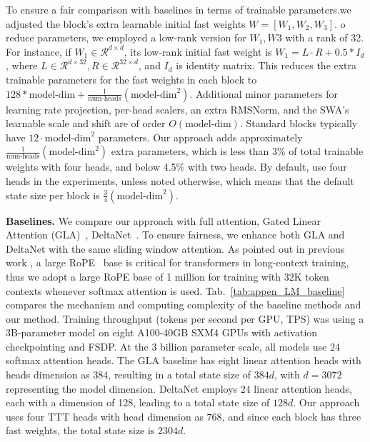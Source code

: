 \documentclass{article}
\begin{document}
To ensure a fair comparison with baselines in terms of trainable parameters.we adjusted the \methodname{} block's extra learnable initial fast weights $W = [W_1, W_2, W_3]$. o reduce parameters, we employed a low-rank version for $W_1, W3$ with a rank of 32. For instance, if $W_1 \in \mathcal{R}^{d\times d}$, its low-rank initial fast weight is $W_1 = L \cdot R + 0.5 * I_d$, where $L \in \mathcal{R}^{d\times32}, R \in \mathcal{R}^{32\times d}$, and $I_d$ is identity matrix. This reduces the extra trainable parameters for the fast weights in each block to $128 * \text{model-dim} + \frac{1}{\text{num-heads}} (\text{model-dim}^2) $. Additional minor parameters for learning rate projection, per-head scalers, an extra RMSNorm, and the SWA's learnable scale and shift are of order $O(\text{model-dim})$.  Standard blocks typically have $12 \cdot \text{model-dim}^2$ parameters. Our approach adds approximately $\frac{1}{\text{num-heads}} (\text{model-dim}^2)$ extra parameters, which is less than 3\% of total trainable weights with four heads, and below 4.5\% with two heads.  By default, \methodname{} use four heads in the experiments, unless noted otherwise, which means that the default state size per block is $\frac{3}{4} (\text{model-dim}^2)$. 

\noindent\textbf{Baselines.}
We compare our approach with full attention, Gated Linear Attention (GLA)~\cite{yang2024gated}, DeltaNet~\cite{schlag2021linear,yangparallelizing}. To ensure fairness, we enhance both GLA and DeltaNet with the same sliding window attention.  As pointed out in previous work \cite{linforgetting, xiong2023effective, men2024base}, a large RoPE~\cite{su2023roformer} base is critical for transformers in long-context training, thus we adopt a large RoPE base of 1 million for training with 32K token contexts whenever softmax attention is used.
Tab.~\ref{tab:appen_LM_baseline} compares the mechanism and computing complexity of the baseline methods and our method. Training throughput (tokens per second per GPU, TPS) was using a 3B-parameter model on eight A100-40GB SXM4 GPUs with activation checkpointing and FSDP. At the 3 billion parameter scale, all models use 24 softmax attention heads.  The GLA baseline has eight linear attention heads with heads dimension as 384, resulting in a total state size of $384d$, with $d=3072$ representing the model dimension.  DeltaNet employs 24 linear attention heads, each with a dimension of 128, leading to a total state size of $128d$. Our approach uses four TTT heads with head dimension as $768$, and since each block has three fast weights, the total state size is $2304d$. 
\end{document}
